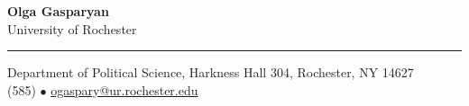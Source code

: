 \documentclass[letterpaper,11pt,oneside]{article}
\begin{document}
\begin{center}
  \noindent \Large{\textbf{Olga Gasparyan}}  \\
\vspace{0.3ex}
 \Large{University of Rochester}
\end{center}
\begin{center}
\noindent\rule{16cm}{0.4pt}
\end{center}
\normalsize



\begin{center}
Department of Political Science, Harkness Hall 304, Rochester, NY 14627 \\
(585) $\bullet$  \href{mailto:ogaspary@ur.rochester.edu}{ogaspary@ur.rochester.edu}  
\\

\end{center}

\vspace{1em}

\end{document}
